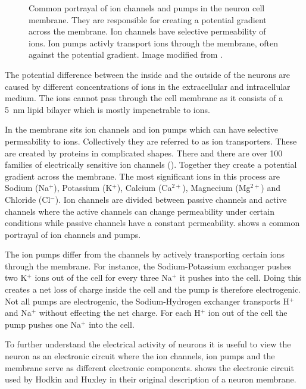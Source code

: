 \documentclass[altfont, fleqn]{uiophd}
\renewcommand{\Cref}[1]{{\color{viridis_03}\myCref{#1}}}
\begin{document}
\begin{figure}[h]
    \caption{
        Common portrayal of ion channels and pumps in the neuron cell membrane. 
        They are responsible for
        creating a potential gradient across the membrane. 
        Ion channels have
        selective permeability of ions. Ion pumps activly transport ions
        through the membrane, often against the potential gradient. 
        Image modified from 
        \textcites{sterratt_principles_2011}.
    }
    \label{fig:2_ion_channels}
\end{figure}
The potential difference between the inside and the outside of the neurons 
are caused by different concentrations of 
ions
in the extracellular and intracellular medium. 
The ions cannot pass through 
the cell membrane as it
consists of a \SI{5}{\nano\metre} lipid bilayer which is mostly impenetrable 
to ions. 

In the membrane sits ion channels and 
ion pumps which can have selective permeability to ions. 
Collectively they are referred to as ion transporters. 
These are created by proteins in complicated shapes. 
There and there are over 100
families of electrically sensitive ion channels
(\textcites{sterratt_principles_2011}).
Together they create a 
potential gradient across the membrane. 
The most significant ions in this process are Sodium (Na$^+$), Potassium (K$^+$), 
Calcium (Ca$^{2+}$), Magnecium (Mg$^{2+}$) and Chloride (Cl$^{-}$). 
Ion channels are divided between passive channels and 
active channels where the active channels can change 
permeability under certain conditions while passive channels have a constant
permeability. 
\Cref{fig:2_ion_channels} shows a common portrayal of ion channels and pumps. 

The ion pumps differ from the channels by actively transporting certain
ions through the membrane. 
For instance, the Sodium-Potassium exchanger pushes two K$^+$ ions out of the cell
for every three Na$^+$ it pushes into the cell. Doing this creates a net 
loss of charge inside the cell and the pump is therefore electrogenic. 
Not all pumps are electrogenic, the Sodium-Hydrogen exchanger transports
H$^+$ and Na$^+$ without effecting the net charge.
For each H$^+$ ion out of the cell the pump pushes one Na$^+$
into the cell. 

To further understand the electrical activity of neurons it is useful
to view the neuron as an electronic circuit where the ion channels, ion pumps
and the membrane serve as different electronic components.
\Cref{fig:2_hud_hux} shows the electronic circuit used by Hodkin
and Huxley in their original description of a neuron membrane. 
\textcites{hodgkin_quantitative_1952, sterratt_principles_2011}
\end{document}
